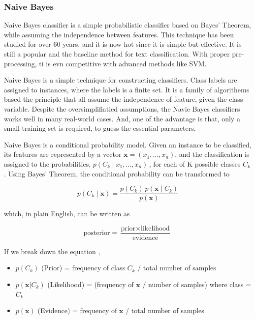 \documentclass[12pt,a4paper]{article}
\begin{document}
    \subsubsection{Naive Bayes}
      Naive Bayes classifier is a simple probabilistic classifier based on Bayes' Theorem, while assuming the independence between features. This technique has been studied for over 60 years, and it is now hot since it is simple but effective. It is still a popular and the baseline method for text classification. With proper pre-processing, ti is evn competitive with advanced methods like SVM.

      Naive Bayes is a simple technique for constructing classifiers. Class labels are assigned to instances, where the labels is a finite set. It is a family of algorithems based the principle that all assume the independence of feature, given the class variable. Despite the oversimplifiatied assumptions, the Navie Bayes classifiers works well in many real-world cases. And, one of the advantage is that, only a small training set is required, to guess the essential parameters. \cite{wiki:naive_bayes_classifier}

      Naive Bayes is a conditional probability model. Given an instance to be classified, its features are represented by a vector $\mathbf{x} = (x_1, \dots, x_n)$, and the classification is assigned to the probabilities, $p(C_k \mid x_1, \dots, x_n)\,$, for each of K possible classes $C_k$. Using Bayes' Theorem, the conditional probability can be transformed to

      \[p(C_k \mid \mathbf{x}) = \frac{p(C_k) \ p(\mathbf{x} \mid C_k)}{p(\mathbf{x})} \]

      which, in plain English, can be written as

      \[
        \mbox{posterior} = \frac{\mbox{prior} \times \mbox{likelihood}}{\mbox{evidence}} \,
      \]

      If we break down the equation \cite{LT_2015},

      \begin{itemize}
        \item \(p(C_k) \) (Prior) = frequency of class $C_k$ / total number of samples
        \item $p(\mathbf{x} \vert C_k)$ (Likelihood) = (frequency of $\mathbf{x}$ / number of samples) where class = $C_k$
        \item $p(\mathbf{x})$ (Evidence) = frequency of $\mathbf{x}$ / total number of samples
      \end{itemize}
\end{document}
